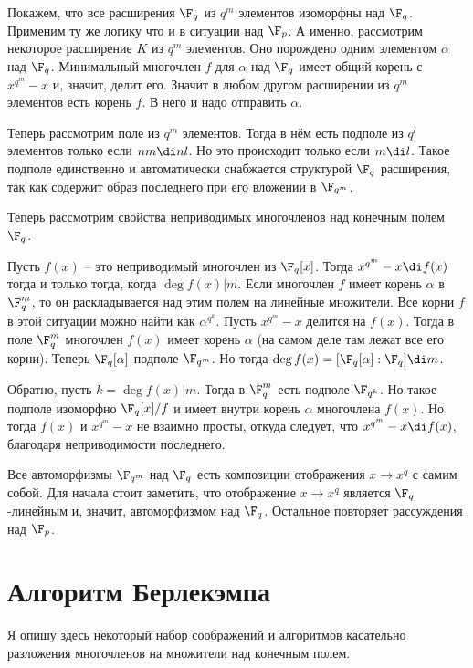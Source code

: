 Покажем, что все расширения $\F_q$ из $q^m$ элементов изоморфны над $\F_q$. Применим ту же логику что и в ситуации над $\F_p$. А именно, рассмотрим некоторое расширение $K$ из $q^m$ элементов. Оно порождено одним элементом $\alpha$ над $\F_q$. Минимальный многочлен $f$ для $\alpha$ над $\F_q$ имеет общий корень с $x^{q^m}-x$ и, значит, делит его. Значит в любом другом расширении из $q^m$ элементов есть корень $f$. В него и надо отправить $\alpha$.

Теперь рассмотрим поле из $q^m$ элементов. Тогда в нём есть подполе из $q^l$ элементов только если $nm \di nl$. Но это происходит только если $m \di l$. Такое подполе единственно и автоматически снабжается структурой $\F_q$ расширения, так как содержит образ последнего при его вложении в $\F_{q^m}$.
\endproof
\ethrm

Теперь рассмотрим свойства неприводимых многочленов над конечным полем $\F_q$.

\crl Пусть $f(x)$ -- это неприводимый многочлен из $\F_q[x]$. Тогда $x^{q^m}-x \di f(x)$ тогда и только тогда, когда $\deg f(x) | m$. Если многочлен $f$ имеет корень $\alpha$ в $\F_q^m$, то он раскладывается над этим полем на линейные множители. Все корни $f$ в этой ситуации можно найти как $\alpha^{q^k}$. 
\proof Пусть $x^{q^m}-x$ делится на $f(x)$. Тогда в поле $\F_q^m$ многочлен $f(x)$ имеет корень $\alpha$ (на самом деле там лежат все его корни). Теперь $\F_q[\alpha]$ подполе $\F_{q^m}$. Но тогда $\deg f(x) = [\F_q[\alpha]: \F_q] \di m $. 

Обратно, пусть $k=\deg f(x) | m$. Тогда в $\F_q^m$ есть подполе $\F_{q^k}$. Но такое подполе изоморфно $\F_q[x]/f$ и имеет внутри корень $\alpha$ многочлена $f(x)$. Но тогда $f(x)$ и $x^{q^m}-x$ не взаимно просты, откуда следует, что $x^{q^m}-x \di f(x)$, благодаря неприводимости последнего. 
\endproof
\ecrl


\utv Все автоморфизмы $\F_{q^m}$ над $\F_q$ есть композиции отображения $x \to x^q$ с самим собой.
\eutv
\proof Для начала стоит заметить, что отображение $x\to x^q$ является $\F_q$-линейным и, значит, автоморфизмом над $\F_q$. Остальное повторяет рассуждения над $\F_p$.
\endproof

\section{Алгоритм Берлекэмпа}


Я опишу здесь некоторый набор соображений и алгоритмов касательно разложения многочленов на множители над конечным полем. 

